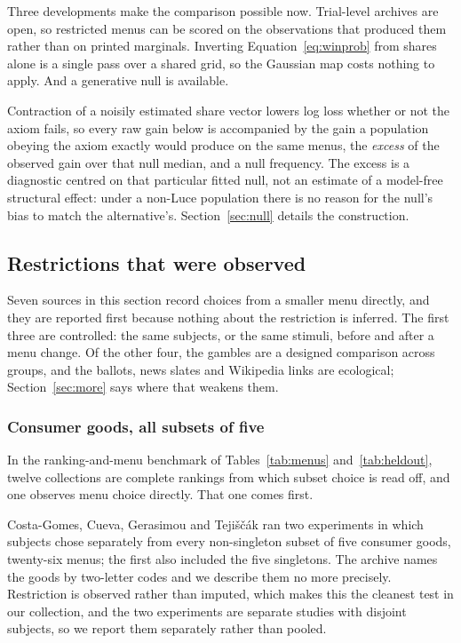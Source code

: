 \documentclass[11pt]{article}
\theoremstyle{italichead}
\begin{document}
Three developments make the comparison possible now. Trial-level archives are open, so restricted menus can be
scored on the observations that produced them rather than on printed marginals. Inverting
Equation~\eqref{eq:winprob} from shares alone is a single pass over a shared grid, so the
Gaussian map costs nothing to apply. And a generative null is available.

Contraction of a noisily
estimated share vector lowers log loss whether or not the axiom fails, so every raw gain below is
accompanied by the gain a population obeying the axiom exactly would produce on the same menus,
the \emph{excess} of the observed gain over that null median, and a null frequency. The excess is a diagnostic centred on that particular
fitted null, not an estimate of a model-free structural effect: under a non-Luce population there
is no reason for the null's bias to match the alternative's. Section~\ref{sec:null} details the
construction.

\subsection{Restrictions that were observed}
\label{sec:observed}

Seven sources in this section record choices from a smaller menu directly, and they are
reported first because nothing about the restriction is inferred. The first three are
controlled: the same subjects, or the same stimuli, before and after a menu change. Of the other
four, the gambles are a designed comparison across groups, and the ballots, news slates and
Wikipedia links are ecological; Section~\ref{sec:more} says where that weakens them.

\subsubsection{Consumer goods, all subsets of five}
\label{sec:menus}

In the ranking-and-menu benchmark of Tables~\ref{tab:menus} and~\ref{tab:heldout}, twelve
collections are complete rankings from which subset choice is read off, and one observes menu
choice directly. That one comes first.

Costa-Gomes, Cueva, Gerasimou and Teji\v{s}\v{c}\'ak \cite{costagomes2022} ran two
experiments in which subjects chose separately from every non-singleton subset of five
consumer goods, twenty-six menus; the first also included the five singletons. The archive
names the goods by two-letter codes and we describe them no more precisely. Restriction is
observed rather than imputed, which makes this the cleanest test in our collection, and the
two experiments are separate studies with disjoint subjects, so we report them separately
rather than pooled.
\end{document}
